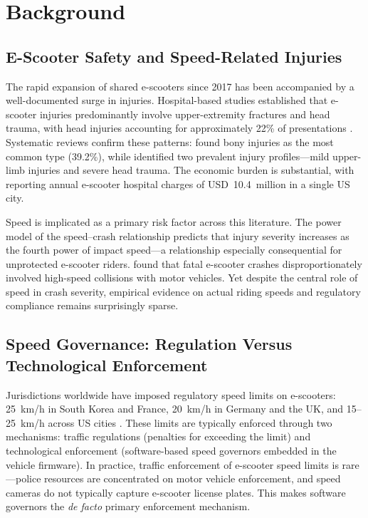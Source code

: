 \section{Background}
\label{sec:background}

\subsection{E-Scooter Safety and Speed-Related Injuries}
\label{sec:bg_safety}

The rapid expansion of shared e-scooters since 2017 has been accompanied by a well-documented surge in injuries. Hospital-based studies established that e-scooter injuries predominantly involve upper-extremity fractures and head trauma, with head injuries accounting for approximately 22\% of presentations \citep{trivedi2019injuries, badeau2019emergency, bloom2021standing}. Systematic reviews confirm these patterns: \citet{singh2022impact} found bony injuries as the most common type (39.2\%), while \citet{spota2024injury} identified two prevalent injury profiles---mild upper-limb injuries and severe head trauma. The economic burden is substantial, with \citet{kahan2024escooter} reporting annual e-scooter hospital charges of USD~10.4~million in a single US city.

Speed is implicated as a primary risk factor across this literature. The power model of the speed--crash relationship \citep{elvik2013reexamination} predicts that injury severity increases as the fourth power of impact speed---a relationship especially consequential for unprotected e-scooter riders. \citet{yang2020safety} found that fatal e-scooter crashes disproportionately involved high-speed collisions with motor vehicles. Yet despite the central role of speed in crash severity, empirical evidence on actual riding speeds and regulatory compliance remains surprisingly sparse.

\subsection{Speed Governance: Regulation Versus Technological Enforcement}
\label{sec:bg_governance}

Jurisdictions worldwide have imposed regulatory speed limits on e-scooters: 25~km/h in South Korea \citep{koreaherald2020escooter} and France, 20~km/h in Germany and the UK, and 15--25~km/h across US cities \citep{ma2021municipal, sexton2023shared}. These limits are typically enforced through two mechanisms: traffic regulations (penalties for exceeding the limit) and technological enforcement (software-based speed governors embedded in the vehicle firmware). In practice, traffic enforcement of e-scooter speed limits is rare---police resources are concentrated on motor vehicle enforcement, and speed cameras do not typically capture e-scooter license plates. This makes software governors the \textit{de facto} primary enforcement mechanism.

